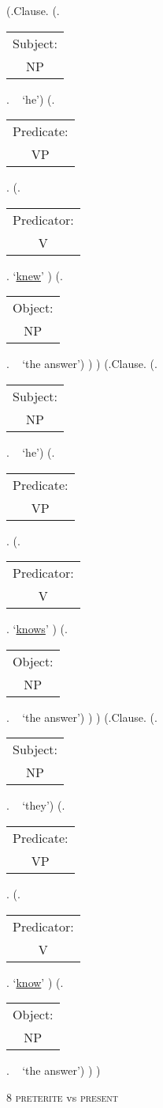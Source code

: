 \documentclass[12pt,letterpaper]{article}
\begin{document}
\begin{figure}
\begin{center}
\begin{parsetree}
			\hfill \break\hfill \break\hfill \break
			(.Clause.
			(.\begin{tabular}{c}Subject:\\NP\end{tabular}. ~ `he')
			(.\begin{tabular}{c}Predicate:\\VP\end{tabular}.
			(.\begin{tabular}{c}Predicator:\\V\end{tabular}. `\underline{knew}' )
			(.\begin{tabular}{c}Object:\\NP\end{tabular}. ~ `the answer')
			)
			)
			(.Clause.
			(.\begin{tabular}{c}Subject:\\NP\end{tabular}. ~ `he')
			(.\begin{tabular}{c}Predicate:\\VP\end{tabular}.
			(.\begin{tabular}{c}Predicator:\\V\end{tabular}. `\underline{knows}' )
			(.\begin{tabular}{c}Object:\\NP\end{tabular}. ~ `the answer')
			)
			)
			(.Clause.
			(.\begin{tabular}{c}Subject:\\NP\end{tabular}. ~ `they')
			(.\begin{tabular}{c}Predicate:\\VP\end{tabular}.
			(.\begin{tabular}{c}Predicator:\\V\end{tabular}. `\underline{know}' )
			(.\begin{tabular}{c}Object:\\NP\end{tabular}. ~ `the answer')
			)
			)
			
			\hfill \break\hfill \break
		\end{parsetree}
		8  \textsc{preterite} vs \textsc{present}
	\end{center}
\end{figure}
\end{document}
